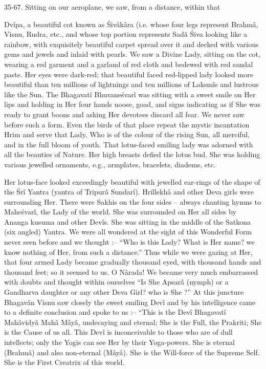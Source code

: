 35-67. Sitting on our aeroplane, we saw, from a distance, within that

Dv\^ipa, a beautiful cot known as \'Siv\^ak\^ara (i.e. whose four legs represent Brahm\^a, Visnu, Rudra, etc., and whose top portion represents Sad\^a \'Siva looking like a rainbow, with exquisitely beautiful carpet spread over it and decked with various gems and jewels and inlaid with pearls. We saw a Divine Lady, sitting on the cot, wearing a red garment and a garland of red cloth and bedewed with red sandal paste. Her eyes were dark-red; that beautiful faced red-lipped lady looked more beautiful than ten millions of lightnings and ten millions of Laksm\^is and lustrous like the Sun. The Bhagavat\^i Bhuvane\'svar\^i was sitting with a sweet smile on Her lips and holding in Her four hands noose, goad, and signs indicating as if She was ready to grant boons and asking Her devotees discard all fear. We never saw before such a form. Even the birds of that place repeat the mystic incantation Hrim and serve that Lady, Who is of the colour of the rising Sun, all merciful, and in the full bloom of youth. That lotus-faced smiling lady was adorned with all the beauties of Nature. Her high breasts defied the lotus bud. She was holding various jewelled ornaments, e.g., armplates, bracelets, diadems, etc.

Her lotus-face looked exceedingly beautiful with jewelled ear-rings of the shape of the \'Sr\^i Yantra (yantra of Tripur\^a Sundar\^i). Hrillekh\^a and other Deva girls were surrounding Her. There were Sakhis on the four sides -- always chanting hymns to Mahe\'svar\^i, the Lady of the world. She was surrounded on Her all sides by Ananga kusuma and other Dev\^is. She was sitting in the middle of the Satkona (six angled) Yantra. We were all wondered at the sight of this Wonderful Form never seen before and we thought :-- ``Who is this Lady? What is Her name? we know nothing of Her, from such a distance.'' Thus while we were gazing at Her, that four armed Lady became gradually thousand eyed, with thousand hands and thousand feet; so it seemed to us. O N\^arada! We became very much embarrassed with doubts and thought within ourselves ``Is She Apsar\^a (nymph) or a Gandharva daughter or any other Deva Girl? who is She ?'' At this juncture Bhagav\^an Visnu saw closely the sweet smiling Dev\^i and by his intelligence came to a definite conclusion and spoke to us :-- ``This is the Dev\^i Bhagavat\^i Mah\^avidy\^a Mah\^a M\^ay\^a, undecaying and eternal; She is the Full, the Prakriti; She is the Cause of us all. This Dev\^i is inconceivable to those who are of dull intellects; only the Yogis can see Her by their Yoga-powers. She is eternal (Brahm\^a) and also non-eternal (M\^ay\^a). She is the Will-force of the Supreme Self. She is the First Creatrix of this world.

